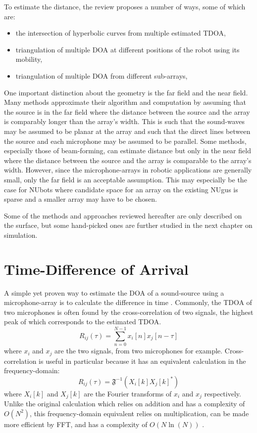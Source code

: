 \documentclass{report}
\begin{document}
To estimate the distance, the review proposes a number of ways, some of which are:
\begin{itemize}
	\item the intersection of hyperbolic curves from multiple estimated TDOA,
	\item triangulation of multiple DOA at different positions of the robot using its mobility,
	\item triangulation of multiple DOA from different sub-arrays,
\end{itemize}

One important distinction about the geometry is the far field and the near field. Many methods approximate their algorithm and computation by assuming that the source is in the far field where the distance between the source and the array is comparably longer than the array's width. This is such that the sound-waves may be assumed to be planar at the array and such that the direct lines between the source and each microphone may be assumed to be parallel. Some methods, especially those of beam-forming, can estimate distance but only in the near field where the distance between the source and the array is comparable to the array's width. However, since the microphone-arrays in robotic applications are generally small, only the far field is an acceptable assumption. This may especially be the case for NUbots where candidate space for an array on the existing NUgus is sparse and a smaller array may have to be chosen.

Some of the methods and approaches reviewed hereafter are only described on the surface, but some hand-picked ones are further studied in the next chapter on simulation.

\section{Time-Difference of Arrival}

A simple yet proven way to estimate the DOA of a sound-source using a microphone-array is to calculate the difference in time \cite{argentieri_survey_2015}. Commonly, the TDOA of two microphones is often found by the cross-correlation of two signals, the highest peak of which corresponds to the estimated TDOA. 
\begin{equation}
R_{ij}(\tau) = \sum_{n=0}^{N-1} x_i[n]x_j[n-\tau]
\end{equation}
where $x_i$ and $x_j$ are the two signals, from two microphones for example. Cross-correlation is useful in particular because it has an equivalent calculation in the frequency-domain:
\begin{equation}
R_{ij}(\tau) = \mathfrak{F}^{-1} \left( X_i[k]X_j[k]^* \right)
\end{equation}
where $X_i[k]$ and $X_j[k]$ are the Fourier transforms of $x_i$ and $x_j$ respectively. Unlike the original calculation which relies on addition and has a complexity of $O(N^2)$, this frequency-domain equivalent relies on multiplication, can be made more efficient by FFT, and has a complexity of $O\left(N\ln(N)\right)$ \cite{valin_robust_2003}.
\end{document}
